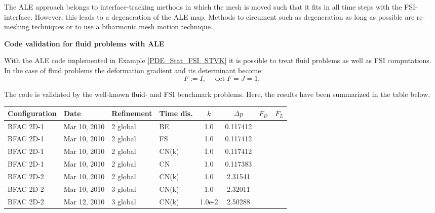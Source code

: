 The ALE approach belongs to interface-tracking methods in which 
the mesh is moved such that it fits in all time steps with 
the FSI-interface. However, this leads to 
a degeneration of the ALE map. Methods to circument such as 
degeneration as long as possible are re-meshing techniques or 
to use a biharmonic mesh motion technique.




\newpage

{\bf Code validation for fluid problems with ALE}

With the ALE code implemented in Example 
\ref{PDE_Stat_FSI_STVK} it is possible to treat fluid 
problems as well as FSI computations. 
In the case of fluid problems the deformation
gradient and its determinant become:
\begin{equation*}
F:= I , \quad \det F = J = 1.
\end{equation*}

The code is validated by the well-known 
fluid- and FSI benchmark problems. Here, 
the results have been summarized in the table below.

 \begin{table}[h]
   \small
   \centering
     \begin{tabular}{llllcccc}    
       \hline
       Configuration & Date         & Refinement & Time dis. & $k$ & $\Delta p$& $F_D$ & $F_L$   \\ \hline\hline
       BFAC 2D-1     & Mar 10, 2010 & 2 global   & BE        & 1.0    & 0.117412  &       &         \\
       BFAC 2D-1     & Mar 10, 2010 & 2 global   & FS        & 1.0    & 0.117412  &       &         \\
       BFAC 2D-1     & Mar 10, 2010 & 2 global   & CN(k)     & 1.0    & 0.117412  &       &         \\ 
       BFAC 2D-1     & Mar 10, 2010 & 2 global   & CN        & 1.0    & 0.117383  &       &         \\ 
       BFAC 2D-2     & Mar 10, 2010 & 2 global   & CN(k)     & 1.0    & 2.31541   &       &         \\ 
       BFAC 2D-2     & Mar 10, 2010 & 3 global   & CN(k)     & 1.0    & 2.32011   &       &         \\   
       BFAC 2D-2     & Mar 12, 2010 & 3 global   & CN(k)     & 1.0e-2 & 2.50288   &       &         \\   
     \end{tabular}
  \end{table}
 
